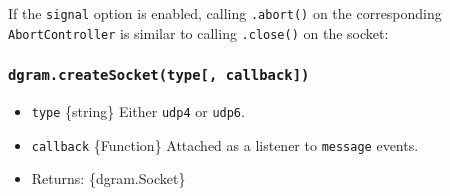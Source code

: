 If the \texttt{signal} option is enabled, calling \texttt{.abort()} on
the corresponding \texttt{AbortController} is similar to calling
\texttt{.close()} on the socket:

\begin{Shaded}
\begin{Highlighting}[]
\OperatorTok{=}  \NormalTok{()}\OperatorTok{;}
\OperatorTok{=}\OperatorTok{;}
\OperatorTok{=}\NormalTok{(\{ }\OperatorTok{:} \OperatorTok{,}\OperatorTok{;}
\NormalTok{(}\OperatorTok{,}\OperatorTok{,}\KeywordTok{=\textgreater{}}\NormalTok{ \{}
  \NormalTok{(}\SpecialCharTok{$\{}\SpecialCharTok{\}}\SpecialCharTok{$\{}\SpecialCharTok{\}}\VerbatimStringTok{:}\SpecialCharTok{$\{}\SpecialCharTok{\}}\VerbatimStringTok{\textasciigrave{}}\NormalTok{)}\OperatorTok{;}
\NormalTok{\})}\OperatorTok{;}
\NormalTok{()}\OperatorTok{;}
\end{Highlighting}
\end{Shaded}

\subsubsection{\texorpdfstring{\texttt{dgram.createSocket(type{[},\ callback{]})}}{dgram.createSocket(type{[}, callback{]})}}\label{dgram.createsockettype-callback}

\begin{itemize}
\tightlist
\item
  \texttt{type} \{string\} Either
  \texttt{\textquotesingle{}udp4\textquotesingle{}} or
  \texttt{\textquotesingle{}udp6\textquotesingle{}}.
\item
  \texttt{callback} \{Function\} Attached as a listener to
  \texttt{\textquotesingle{}message\textquotesingle{}} events.
\item
  Returns: \{dgram.Socket\}
\end{itemize}

